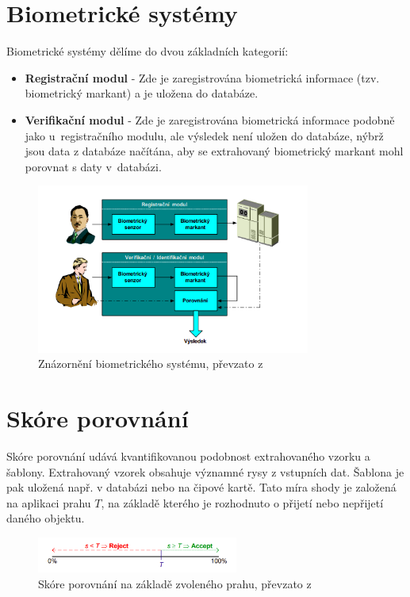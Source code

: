 \section{Biometrické systémy}
Biometrické systémy dělíme do dvou základních kategorií\cite{Drahansky}:
\begin{itemize}
    \item \textbf{Registrační modul} - Zde je zaregistrována biometrická informace (tzv. biometrický markant) a je uložena do databáze.
    \item \textbf{Verifikační modul} - Zde je zaregistrována biometrická informace podobně jako u~registračního modulu, ale výsledek není uložen do databáze, nýbrž jsou data z databáze načítána, aby se extrahovaný biometrický markant mohl porovnat s daty v~databázi. 
\end{itemize}

\begin{figure}[!htbp]
    \centering
    \includegraphics[width=340px]{obrazky-figures/biosystem.png}
    \caption{Znázornění biometrického systému, převzato z \cite{Drahansky}}
\end{figure}

\section{Skóre porovnání}
Skóre porovnání udává kvantifikovanou podobnost extrahovaného vzorku a šablony. Extrahovaný vzorek obsahuje významné rysy z vstupních dat. Šablona je pak uložená např. v databázi nebo na čipové kartě. Tato míra shody je založená na aplikaci prahu $T$, na základě kterého je rozhodnuto o přijetí nebo nepřijetí daného objektu.\cite{Drahansky}

\begin{figure}[!htbp]
    \centering
    \includegraphics[width=250px]{obrazky-figures/mira.png}
    \caption{Skóre porovnání na základě zvoleného prahu, převzato z \cite{Drahansky}}
\end{figure}

